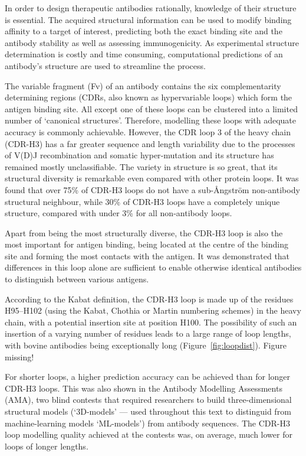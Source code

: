 \documentclass[12pt]{article}
\newcommand{\lilian}[1]{ {\color{red}{\bfseries Lilian:} #1}}
\begin{document}
In order to design therapeutic antibodies rationally, knowledge of
their structure is essential. The acquired structural information can
be used to modify binding affinity to a target of interest,
predicting both the exact binding site and the antibody stability as
well as assessing immunogenicity\cite{Abhinandan2007}. As
experimental structure determination is costly and time
consuming, computational predictions of an antibody's structure are
used to streamline the process.

The variable
fragment (Fv) of an antibody contains the six complementarity determining regions
(CDRs, also known as hypervariable loops) which form the antigen binding site.
All except one of these loops can be clustered
into a limited number of `canonical structures'\cite{Al-Lazikani}. Therefore, modelling
these loops with adequate accuracy is commonly
achievable\cite{North2011}.  However, the CDR loop 3 of the 
heavy chain (CDR-H3) has a far greater sequence and length variability due to the
processes of V(D)J recombination and somatic hyper‐mutation and its
structure has remained mostly unclassifiable\cite{Finn2016}. The variety in
structure is so great, that its structural diversity is remarkable
even compared with other protein loops\cite{Regep2017}. It was found
that over 75\% of CDR-H3 loops do not have a sub-{\AA}ngstr\"{o}m non-antibody
structural neighbour, while 30\% of CDR-H3 loops have a
completely unique structure, compared with under 3\% for all non-antibody
loops\cite{Regep2017}.

Apart from being the most structurally diverse, the CDR-H3 loop is
also the most important for antigen binding, being located at the
centre of the binding site and forming the most contacts with the
antigen\cite{MacCallum1996}. It was demonstrated that
differences in this loop alone are sufficient to enable otherwise
identical antibodies to distinguish between various
antigens\cite{Xu2000}.

According to the Kabat definition, the CDR-H3 loop is made up of the
residues H95--H102 (using the Kabat\cite{Kabat1992}, Chothia\cite{Al-Lazikani} or Martin\cite{Abhinandan2008} numbering schemes) in the heavy
chain, with a potential insertion site at position H100. The
possibility of such an insertion of a varying number of residues leads
to a large range of loop lengths, with bovine antibodies being
exceptionally long (Figure~\ref{fig:loopdist}).\lilian{Figure missing!}

For shorter loops, a higher prediction accuracy can be achieved than
for longer CDR-H3 loops. This was also shown in the Antibody Modelling
Assessments (AMA), two blind contests that required researchers to
build three-dimensional structural models (`3D-models' --- used throughout this text to distinguid from machine-learning models `ML-models') from antibody sequences. The CDR-H3 loop
modelling quality achieved at the contests was, on average, much lower
for loops of longer lengths\cite{Almagro2011,Almagro2014}.
\end{document}
